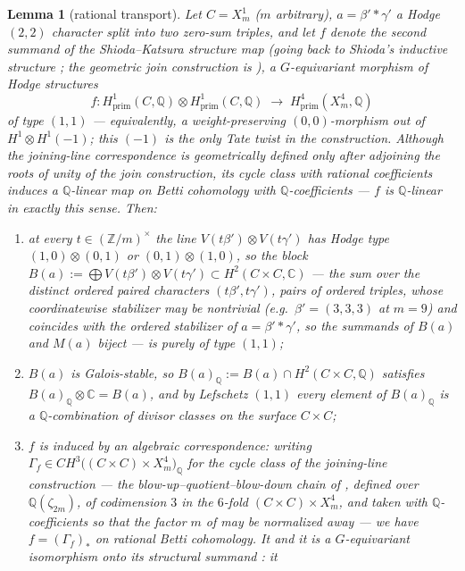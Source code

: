 \documentclass[11pt]{amsart}
\newtheorem{lemma}[theorem]{Lemma}
\theoremstyle{remark}
\newcommand{\Q}{\mathbb{Q}}
\newcommand{\Z}{\mathbb{Z}}
\newcommand{\V}{V}
\newcommand{\zt}{\zeta}
\newcommand{\C}{\mathbb{C}}
\begin{document}
\begin{lemma}[rational transport]\label{lem:transport}
Let $C=X^1_m$ ($m$ arbitrary), $a=\beta'\!*\gamma'$ a Hodge $(2,2)$ character split into two zero-sum
triples, and let $f$ denote the second summand of the Shioda--Katsura structure map
\cite[Thm.~2.2]{daSilva} (going back to Shioda's inductive structure \cite{Shioda79}; the
geometric join construction is \cite[Thm.~1.7]{SK}), a $G$-equivariant morphism of Hodge structures
\[
f\colon H^1_{\mathrm{prim}}(C,\Q)\otimes H^1_{\mathrm{prim}}(C,\Q)\;\longrightarrow\;
H^4_{\mathrm{prim}}(X^4_m,\Q)
\]
of type $(1,1)$ --- equivalently, a weight-preserving $(0,0)$-morphism out of
$H^1\otimes H^1(-1)$; this $(-1)$ is the only Tate twist in the construction. Although the
joining-line correspondence is geometrically defined only after adjoining the roots of unity
of the join construction, its cycle class with rational coefficients induces a $\Q$-linear
map on Betti cohomology with $\Q$-coefficients --- $f$ is $\Q$-linear in exactly this sense.
Then:
\begin{enumerate}
\item[(i)] at every $t\in(\Z/m)^\times$ the line $\V(t\beta')\otimes\V(t\gamma')$ has Hodge type
$(1,0)\otimes(0,1)$ or $(0,1)\otimes(1,0)$, so the block
$B(a):=\bigoplus\V(t\beta')\otimes\V(t\gamma')\subset H^2(C\times C,\C)$ --- the sum over the
distinct \emph{ordered} paired characters $(t\beta',t\gamma')$, pairs of ordered triples, whose
coordinatewise stabilizer may be nontrivial (e.g.\ $\beta'=(3,3,3)$ at $m=9$) and coincides with
the ordered stabilizer of $a=\beta'*\gamma'$, so the summands of $B(a)$ and $M(a)$ biject ---
is purely of type
$(1,1)$;
\item[(ii)] $B(a)$ is Galois-stable, so $B(a)_\Q:=B(a)\cap H^2(C\times C,\Q)$ satisfies
$B(a)_\Q\otimes\C=B(a)$, and by Lefschetz $(1,1)$ every element of $B(a)_\Q$ is a $\Q$-combination
of divisor classes on the surface $C\times C$;
\item[(iii)] $f$ is induced by an algebraic correspondence: writing $\Gamma_f\in
CH^3\bigl((C\times C)\times X^4_m\bigr)_\Q$ for the cycle class of the joining-line
construction --- the blow-up--quotient--blow-down chain of \cite{SK}, defined over
$\Q(\zt_{2m})$, of codimension $3$ in the $6$-fold $(C\times C)\times X^4_m$, and taken with
$\Q$-coefficients so that the factor $m$ of \cite[Thm.~2.2(c)]{daSilva} may be normalized away
--- we have $f=(\Gamma_f)_*$ on rational Betti cohomology. It and it is a
$G$-equivariant \emph{isomorphism} onto its structural summand \cite[Thm.~2.2]{daSilva}: it

\end{enumerate}
\end{lemma}
\end{document}
